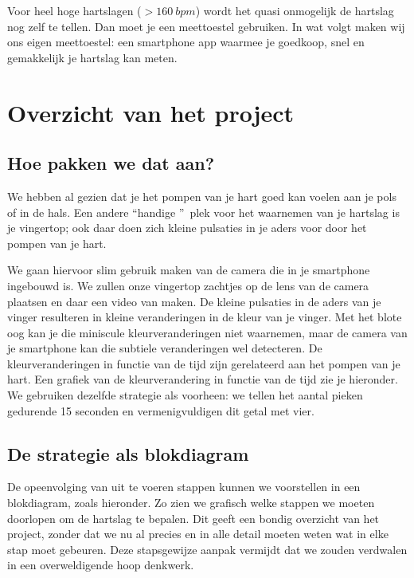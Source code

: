 Voor heel hoge hartslagen ($>160~bpm$) wordt het quasi onmogelijk de hartslag nog zelf te tellen. Dan moet je een meettoestel gebruiken. In wat volgt maken wij ons eigen meettoestel: een smartphone app waarmee je goedkoop, snel en gemakkelijk je hartslag kan meten.

\section{Overzicht van het project}
\label{sec:Mod1_Sec3}

\subsection{Hoe pakken we dat aan?}
We hebben al gezien dat je het pompen van je hart goed kan voelen aan je pols of in de hals. Een andere \textquotedblleft handige \textquotedblright \ plek voor het waarnemen van je hartslag is je vingertop; ook daar doen zich kleine pulsaties in je aders voor door het pompen van je hart. 


We gaan hiervoor slim gebruik maken van de camera die in je smartphone ingebouwd is. 
We zullen onze vingertop zachtjes op de lens van de camera plaatsen en daar een video van maken. 
De kleine pulsaties in de aders van je vinger resulteren in kleine veranderingen in de kleur van je vinger. 
Met het blote oog kan je die miniscule kleurveranderingen niet waarnemen, maar de camera van je smartphone kan die subtiele veranderingen wel detecteren. 
De kleurveranderingen in functie van de tijd zijn gerelateerd aan het pompen van je hart. Een grafiek van de kleurverandering in functie van de tijd zie je hieronder. We gebruiken dezelfde strategie als voorheen: we tellen het aantal pieken gedurende 15 seconden en vermenigvuldigen dit getal met vier.


\subsection{De strategie als blokdiagram}

De opeenvolging van uit te voeren stappen kunnen we voorstellen in een blokdiagram, zoals hieronder. Zo zien we grafisch welke stappen we moeten doorlopen om de hartslag te bepalen. Dit geeft een bondig overzicht van het project, zonder dat we nu al precies en in alle detail moeten weten wat in elke stap moet gebeuren. Deze stapsgewijze aanpak vermijdt dat we zouden verdwalen in een overweldigende hoop denkwerk.


